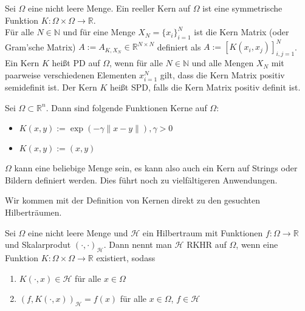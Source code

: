 \begin{definition}
\label{Kern}
Sei $\Omega$ eine nicht leere Menge. Ein reeller Kern auf $\Omega$ ist eine symmetrische Funktion $K: \Omega \times \Omega \rightarrow \mathbb{R}$.\\
Für alle $N \in \mathbb{N}$ und für eine Menge $X_N = \{x_i\}_{i=1}^N$ ist die Kern Matrix (oder Gram'sche Matrix) $A:= A_{K,X_N} \in \mathbb{R}^{N \times N}$  definiert als $A:=[K(x_i, x_j)]_{i,j=1}^N$.\\
Ein Kern $K$ heißt \ac{PD} auf $\Omega$, wenn für alle $N \in \mathbb{N}$ und alle Mengen $X_N$ mit paarweise verschiedenen Elementen $x_{i=1}^N$ gilt, dass die Kern Matrix positiv semidefinit ist. Der Kern $K$ heißt \ac{SPD}, falls die Kern Matrix positiv definit ist.
\end{definition}

\begin{example} Sei $\Omega \subset \mathbb{R}^n$. Dann sind folgende Funktionen Kerne auf $\Omega$:\\
\begin{itemize}
\item $K(x,y) := \exp(-\gamma \|x-y\|),\gamma > 0$
\item $K(x,y) := (x,y)$
\end{itemize}
\end{example}

\begin{remark}
$\Omega$ kann eine beliebige Menge sein, es kann also auch ein Kern auf Strings oder Bildern definiert werden. Dies führt noch zu vielfältigeren Anwendungen.
\end{remark}

Wir kommen mit der Definition von Kernen direkt zu den gesuchten Hilberträumen.

\begin{definition}
Sei $\Omega$ eine nicht leere Menge und $\mathcal{H}$ ein Hilbertraum mit Funktionen $f:\Omega \rightarrow \mathbb{R}$ und Skalarprodut $(\cdot, \cdot)_\mathcal{H}$. Dann nennt man $\mathcal{H}$ \ac{RKHR} auf $\Omega$, wenn eine Funktion $K:\Omega \times \Omega \rightarrow \mathbb{R}$ existiert, sodass
\begin{enumerate}
\item $K(\cdot, x) \in \mathcal{H}$ für alle $x \in \Omega$
\item $(f, K(\cdot,x))_\mathcal{H} = f(x)$ für alle $ x \in \Omega$, $f \in \mathcal{H}$
\end{enumerate}
\end{definition}

